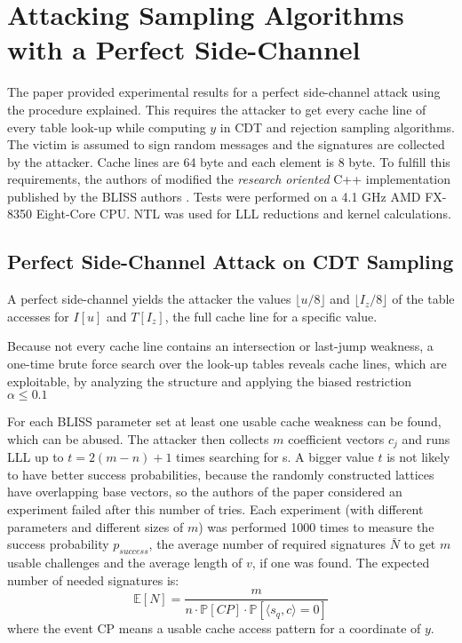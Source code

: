\newpage
\section{Attacking Sampling Algorithms with a Perfect Side-Channel}
The paper \cite{cryptoeprint:2016:300} provided experimental results for a perfect side-channel attack using the procedure explained. This requires the attacker to get every cache line of every table look-up while computing $y$ in CDT and rejection sampling algorithms. The victim is assumed to sign random messages and the signatures are collected by the attacker. Cache lines are 64 byte and each element is 8 byte. 
To fulfill this requirements, the authors of \cite{cryptoeprint:2016:300} modified the \textit{research oriented} C++ implementation published by the BLISS authors \cite{blisshp}. Tests were performed on a 4.1 GHz AMD FX-8350 Eight-Core CPU. NTL was used for LLL reductions and kernel calculations.
\subsection{Perfect Side-Channel Attack on CDT Sampling}
A perfect side-channel yields the attacker the values $\lfloor u/8 \rfloor$ and $\lfloor I_z/8 \rfloor$ of the table accesses for $I[u]$ and $T[I_z]$, the full cache line for a specific value. 

Because not every cache line contains an intersection or last-jump weakness, a one-time brute force search over the look-up tables reveals cache lines, which are exploitable, by analyzing the structure and applying the biased restriction $\alpha \le 0.1$

For each BLISS parameter set at least one usable cache weakness can be found, which can be abused. 
The attacker then collects $m$ coefficient vectors $c_j$ and runs LLL up to $t = 2(m-n)+1$ times searching for s. A bigger value $t$ is not likely to have better success probabilities, because the randomly constructed lattices have overlapping base vectors, so the authors of the paper considered an experiment failed after this number of tries. Each experiment (with different parameters and different sizes of $m$) was performed 1000 times to measure the success probability $p_{success}$, the average number of required signatures $\bar{N}$ to get $m$ usable challenges and the average length of $v$, if one was found.
The expected number of needed signatures is:
\begin{equation*}
\mathbb{E}[N] = \frac{m}{n \cdot \mathbb{P}[CP] \cdot \mathbb{P}[\langle s_q, c \rangle = 0]}
\end{equation*}
where the event CP means a usable cache access pattern for a coordinate of $y$.


